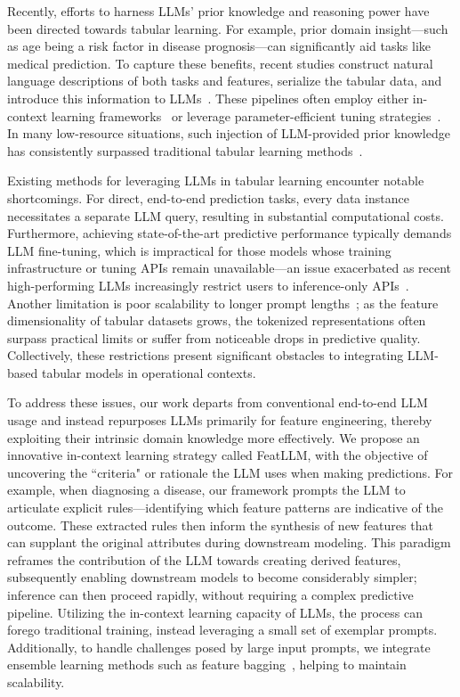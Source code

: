 Recently, efforts to harness LLMs’ prior knowledge and reasoning power have been directed towards tabular learning. For example, prior domain insight—such as age being a risk factor in disease prognosis—can significantly aid tasks like medical prediction. To capture these benefits, recent studies construct natural language descriptions of both tasks and features, serialize the tabular data, and introduce this information to LLMs~\cite{dinh2022lift,wang2023anypredict}. These pipelines often employ either in-context learning frameworks~\cite{nam2023semi} or leverage parameter-efficient tuning strategies~\cite{dinh2022lift,hegselmann2023tabllm}. In many low-resource situations, such injection of LLM-provided prior knowledge has consistently surpassed traditional tabular learning methods~\cite{hegselmann2023tabllm}.

Existing methods for leveraging LLMs in tabular learning encounter notable shortcomings. For direct, end-to-end prediction tasks, every data instance necessitates a separate LLM query, resulting in substantial computational costs. Furthermore, achieving state-of-the-art predictive performance typically demands LLM fine-tuning, which is impractical for those models whose training infrastructure or tuning APIs remain unavailable—an issue exacerbated as recent high-performing LLMs increasingly restrict users to inference-only APIs~\cite{anil2023palm,openai2023gpt4}. Another limitation is poor scalability to longer prompt lengths~\cite{liu2023lost}; as the feature dimensionality of tabular datasets grows, the tokenized representations often surpass practical limits or suffer from noticeable drops in predictive quality. Collectively, these restrictions present significant obstacles to integrating LLM-based tabular models in operational contexts.

To address these issues, our work departs from conventional end-to-end LLM usage and instead repurposes LLMs primarily for feature engineering, thereby exploiting their intrinsic domain knowledge more effectively. We propose an innovative in-context learning strategy called \textsf{FeatLLM}, with the objective of uncovering the ``criteria" or rationale the LLM uses when making predictions. For example, when diagnosing a disease, our framework prompts the LLM to articulate explicit rules—identifying which feature patterns are indicative of the outcome. These extracted rules then inform the synthesis of new features that can supplant the original attributes during downstream modeling. This paradigm reframes the contribution of the LLM towards creating derived features, subsequently enabling downstream models to become considerably simpler; inference can then proceed rapidly, without requiring a complex predictive pipeline. Utilizing the in-context learning capacity of LLMs, the process can forego traditional training, instead leveraging a small set of exemplar prompts. Additionally, to handle challenges posed by large input prompts, we integrate ensemble learning methods such as feature bagging~\cite{breiman2001random}, helping to maintain scalability.

